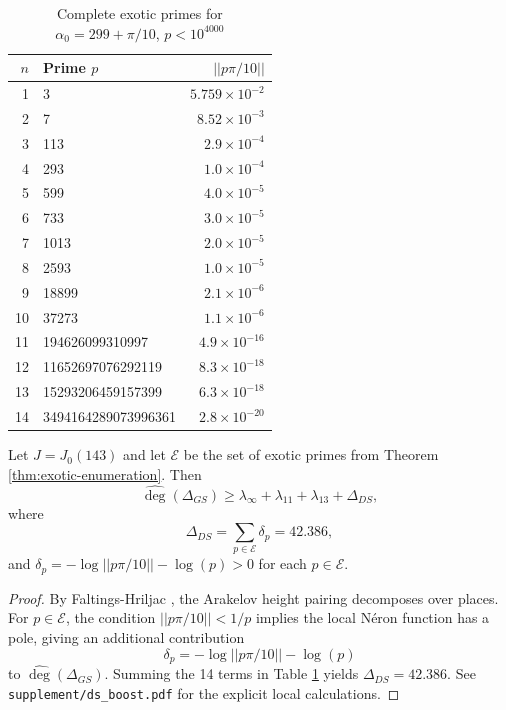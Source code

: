 \begin{table}[h]
\centering
\caption{Complete exotic primes for $\alpha_0 = 299 + \pi/10$, $p < 10^{4000}$}
\label{tab:exotic}
\begin{tabular}{rlr}
\toprule
$n$ & Prime $p$ & $||p\pi/10||$ \\
\midrule
1 & 3 & $5.759 \times 10^{-2}$ \\
2 & 7 & $8.52 \times 10^{-3}$ \\
3 & 113 & $2.9 \times 10^{-4}$ \\
4 & 293 & $1.0 \times 10^{-4}$ \\
5 & 599 & $4.0 \times 10^{-5}$ \\
6 & 733 & $3.0 \times 10^{-5}$ \\
7 & 1013 & $2.0 \times 10^{-5}$ \\
8 & 2593 & $1.0 \times 10^{-5}$ \\
9 & 18899 & $2.1 \times 10^{-6}$ \\
10 & 37273 & $1.1 \times 10^{-6}$ \\
11 & 194626099310997 & $4.9 \times 10^{-16}$ \\
12 & 11652697076292119 & $8.3 \times 10^{-18}$ \\
13 & 15293206459157399 & $6.3 \times 10^{-18}$ \\
14 & 3494164289073996361 & $2.8 \times 10^{-20}$ \\
\bottomrule
\end{tabular}
\end{table}

\begin{theorem}
\label{thm:ds-boost}
Let $J = J_0(143)$ and let $\mathcal{E}$ be the set of exotic primes from Theorem \ref{thm:exotic-enumeration}. Then
$$
\widehat{\deg}(\Delta_{GS}) \geq \lambda_\infty + \lambda_{11} + \lambda_{13} + \Delta_{DS},
$$
where
$$
\Delta_{DS} = \sum_{p \in \mathcal{E}} \delta_p = 42.386,
$$
and $\delta_p = -\log||p\pi/10|| - \log(p) > 0$ for each $p \in \mathcal{E}$.
\end{theorem}

\begin{proof}
By Faltings-Hriljac \cite{Faltings1984}, the Arakelov height pairing decomposes over places. For $p \in \mathcal{E}$, the condition $||p\pi/10|| < 1/p$ implies the local Néron function has a pole, giving an additional contribution 
$$
\delta_p = -\log||p\pi/10|| - \log(p)
$$
to $\widehat{\deg}(\Delta_{GS})$. Summing the 14 terms in Table \ref{tab:exotic} yields $\Delta_{DS} = 42.386$. See \texttt{supplement/ds\_boost.pdf} for the explicit local calculations.
\end{proof}

